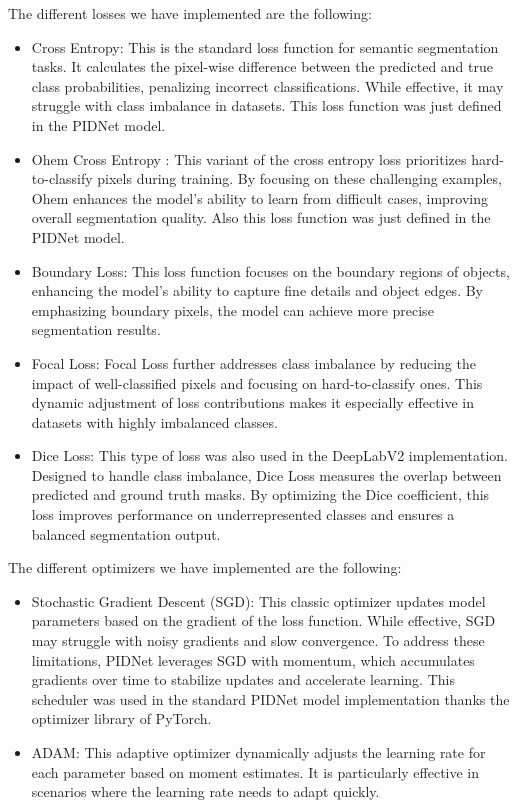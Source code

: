 \documentclass[10pt,twocolumn,letterpaper]{article}
\begin{document}
The different losses we have implemented are the following:
\begin{itemize}
    \item Cross Entropy: This is the standard loss function for semantic segmentation tasks. It calculates the pixel-wise difference between the predicted and true class probabilities, penalizing incorrect classifications. While effective, it may struggle with class imbalance in datasets. This loss function was just defined in the PIDNet model. 
    \item Ohem Cross Entropy : This variant of the cross entropy loss prioritizes hard-to-classify pixels during training. By focusing on these challenging examples, Ohem enhances the model’s ability to learn from difficult cases, improving overall segmentation quality. Also this loss function was just defined in the PIDNet model.
    \item Boundary Loss: This loss function focuses on the boundary regions of objects, enhancing the model’s ability to capture fine details and object edges. By emphasizing boundary pixels, the model can achieve more precise segmentation results. 
    \item Focal Loss:  Focal Loss further addresses class imbalance by reducing the impact of well-classified pixels and focusing on hard-to-classify ones. This dynamic adjustment of loss contributions makes it especially effective in datasets with highly imbalanced classes.
    \item Dice Loss: This type of loss was also used in the DeepLabV2 implementation. Designed to handle class imbalance, Dice Loss measures the overlap between predicted and ground truth masks. By optimizing the Dice coefficient, this loss improves performance on underrepresented classes and ensures a balanced segmentation output.
\end{itemize}

The different optimizers we have implemented are the following:
\begin{itemize}
    \item Stochastic Gradient Descent (SGD): This classic optimizer updates model parameters based on the gradient of the loss function. While effective, SGD may struggle with noisy gradients and slow convergence. To address these limitations, PIDNet leverages SGD with momentum, which accumulates gradients over time to stabilize updates and accelerate learning. This scheduler was used in the standard PIDNet model implementation thanks the optimizer library of PyTorch.
    \item ADAM: This adaptive optimizer dynamically adjusts the learning rate for each parameter based on moment estimates. It is particularly effective in scenarios where the learning rate needs to adapt quickly. 
\end{itemize}
\end{document}
